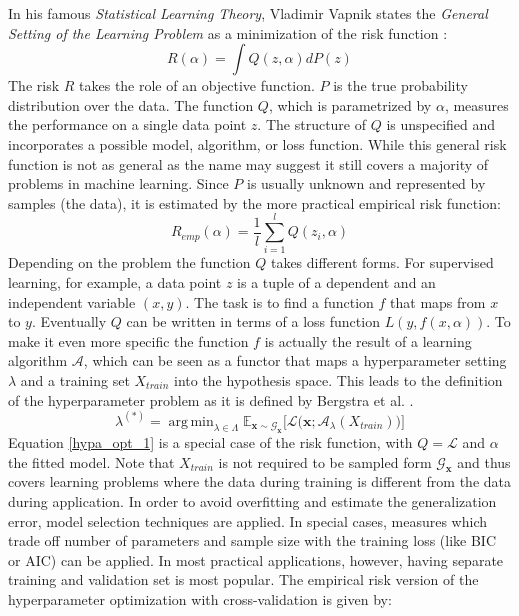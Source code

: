 \documentclass[english]{article}
\newcommand{\x}{\mathbf{x}}
\newcommand{\E}{\mathbb{E}}
\DeclareMathOperator*{\argmin}{arg\,min}
\begin{document}
In his famous \textit{Statistical Learning Theory}, Vladimir Vapnik states the \textit{General Setting of the Learning Problem} as a minimization of the risk function \cite{vapnik_overview_1999}:
\begin{equation}
R(\alpha) = \int Q(z,\alpha)dP(z)
\label{risk}
\end{equation}
The risk $R$ takes the role of an objective function. $P$ is the true probability distribution over the data. The function $Q$, which is parametrized by $\alpha$, measures the performance on a single data point $z$. The structure of $Q$ is unspecified and incorporates a possible model, algorithm, or loss function. While this general risk function is not as general as the name may suggest it still covers a majority of problems in machine learning. Since $P$ is usually unknown and represented by samples (the data), it is estimated by the more practical empirical risk function:
\begin{equation}
R_{emp}(\alpha) = \frac{1}{l} \sum_{i=1}^l Q(z_i,\alpha)
\label{empirical risk}
\end{equation}
Depending on the problem the function $Q$ takes different forms. For supervised learning, for example, a data point $z$ is a tuple of a dependent and an independent variable $(x,y)$. The task is to find a function $f$ that maps from $x$ to $y$. Eventually $Q$ can be written in terms of a loss function $L(y,f(x,\alpha))$.
To make it even more specific the function $f$ is actually the result of a learning algorithm $\mathcal{A}$, which can be seen as a functor that maps a hyperparameter setting $\lambda$ and a training set $X_{train}$ into the hypothesis space. This leads to the definition of the hyperparameter problem as it is defined by Bergstra et al. \cite{bergstra_random_2012}.
\begin{equation}
\lambda^{(*)} = \argmin_{\lambda \in \Lambda} \E_{\x \sim \mathcal{G}_\x}\big[\mathcal{L}\big(\x;\mathcal{A}_\lambda(X_{train})\big)\big]
\label{hypa_opt_1}
\end{equation}
Equation \ref{hypa_opt_1} is a special case of the risk function, with $Q = \mathcal{L}$ and $\alpha$ the fitted model. Note that $X_{train}$ is not required to be sampled form $\mathcal{G}_\x$ and thus covers learning problems where the data during training is different from the data during application.
In order to avoid overfitting and estimate the generalization error, model selection techniques are applied. In special cases, measures which trade off number of parameters and sample size with the training loss (like BIC or AIC) can be applied. In most practical applications,  however, having separate training and validation set is most popular. The empirical risk version of the hyperparameter optimization with cross-validation is given by:
\end{document}
